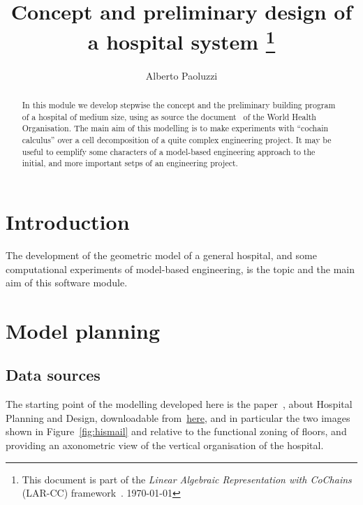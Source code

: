 \documentclass[11pt,oneside]{article}    %
\title{Concept and preliminary design of a hospital system
\footnote{This document is part of the \emph{Linear Algebraic Representation with CoChains} (LAR-CC) framework~\cite{cclar-proj:2013:00}. \today}
}
\author{Alberto Paoluzzi}
\begin{document}
\maketitle
\nonstopmode
\tableofcontents

\begin{abstract}
In this module we develop stepwise the concept and the preliminary building program of a hospital of medium size, using as source the document~\cite{who:2013} of the World Health Organisation. The main aim of this modelling is to make experiments with ``cochain calculus'' over a cell decomposition of a quite complex engineering project. It may be useful to eemplify some characters of a model-based engineering approach to the initial, and more important setps of an engineering project.
\end{abstract}

\section{Introduction}

The development of the geometric model of a general hospital, and some computational experiments of model-based engineering, is the topic and the main aim of this software module.

\section{Model planning}

\subsection{Data sources}

The starting point of the modelling developed here is the paper~\cite{who:2013}, about Hospital Planning and Design, downloadable from~\href{http://paoluzzi.dia.uniroma3.it/web/hospital-planning-and-design.pdf}{here}, and in particular the two images shown in Figure~\ref{fig:hismail} and relative to the functional zoning of floors, and providing an axonometric view of the vertical organisation of the hospital.
\end{document}
